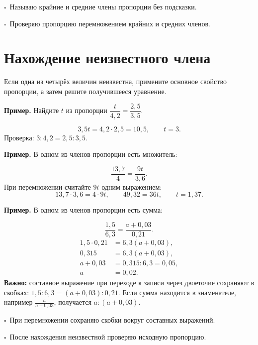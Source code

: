 \documentclass[a4paper,12pt]{article}
\newcommand{\example}[1]{\par\medskip\textcolor{darkaccent}{\textbf{Пример.}} #1\par}
\newcommand{\checkmarkline}[1]{\par\smallskip\textcolor{darkaccent}{$\square$}\ #1\par}
\begin{document}
\checkmarkline{Называю крайние и средние члены пропорции без подсказки.}
\checkmarkline{Проверяю пропорцию перемножением крайних и средних членов.}

\section{Нахождение неизвестного члена}
Если одна из четырёх величин неизвестна, примените основное свойство пропорции,
а затем решите получившееся уравнение.

\example{Найдите $t$ из пропорции $\dfrac{t}{4{,}2}=\dfrac{2{,}5}{3{,}5}$.}
\[
3{,}5t=4{,}2\cdot2{,}5=10{,}5,\qquad
\boxed{t=3}.
\]
Проверка: $3:4{,}2=2{,}5:3{,}5$.

\example{В одном из членов пропорции есть множитель:}
\[
\frac{13{,}7}{4}=\frac{9t}{3{,}6}.
\]
При перемножении считайте $9t$ одним выражением:
\[
13{,}7\cdot3{,}6=4\cdot9t,\qquad
49{,}32=36t,\qquad \boxed{t=1{,}37}.
\]

\example{В одном из членов пропорции есть сумма:}
\[
\frac{1{,}5}{6{,}3}=\frac{a+0{,}03}{0{,}21}.
\]
\begin{align*}
1{,}5\cdot0{,}21&=6{,}3(a+0{,}03),\\
0{,}315&=6{,}3(a+0{,}03),\\
a+0{,}03&=0{,}315:6{,}3=0{,}05,\\
a&=\boxed{0{,}02}.
\end{align*}
\textbf{Важно:} составное выражение при переходе к записи через двоеточие
сохраняют в скобках: $1{,}5:6{,}3=(a+0{,}03):0{,}21$.
Если сумма находится в знаменателе, например $\frac{a}{a+0{,}03}$,
получается $a:(a+0{,}03)$.

\checkmarkline{При перемножении сохраняю скобки вокруг составных выражений.}
\checkmarkline{После нахождения неизвестной проверяю исходную пропорцию.}
\end{document}
